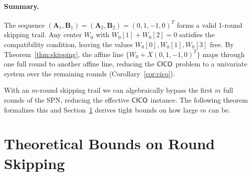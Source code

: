 \documentclass[11pt]{article}
\begin{document}
\paragraph{Summary.}
The sequence $(\mathbf{A}_1,\mathbf{B}_1)=(\mathbf{A}_2,\mathbf{B}_2)=(0,1,-1,0)^T$ forms
a valid 1-round skipping trail.  Any center $W_0$ with $W_0[1]+W_0[2]=0$ satisfies
the compatibility condition, leaving the values $W_0[0], W_0[1], W_0[3]$ free.
By Theorem~\ref{thm:skipping}, the affine line
$\{W_0 + X(0,1,-1,0)^T\}$ maps through one full round to another affine line,
reducing the $\mathsf{CICO}$ problem to a univariate system over the remaining rounds
(Corollary~\ref{cor:cico}).

\medskip

With an $m$-round skipping trail we can algebraically bypass the first $m$ full rounds
of the SPN, reducing the effective $\mathsf{CICO}$ instance. The following theorem formalizes
this and Section~\ref{sec:bounds} derives tight bounds on how large $m$ can be.
\section{Theoretical Bounds on Round Skipping}
\label{sec:bounds}
\end{document}
